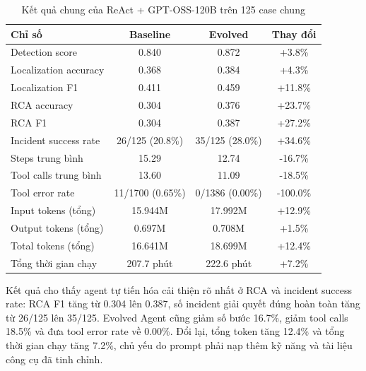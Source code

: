 \begin{table}[t]
\centering
\small
\caption{Kết quả chung của ReAct + GPT-OSS-120B trên 125 case chung}
\begin{tabularx}{\textwidth}{@{}Yccc@{}}
\toprule
\textbf{Chỉ số} & \textbf{Baseline} & \textbf{Evolved} & \textbf{Thay đổi} \\
\midrule
Detection score & 0.840 & 0.872 & +3.8\% \\
Localization accuracy & 0.368 & 0.384 & +4.3\% \\
Localization F1 & 0.411 & 0.459 & +11.8\% \\
RCA accuracy & 0.304 & 0.376 & +23.7\% \\
RCA F1 & 0.304 & 0.387 & +27.2\% \\
Incident success rate & 26/125 (20.8\%) & 35/125 (28.0\%) & +34.6\% \\
\midrule
Steps trung bình & 15.29 & 12.74 & -16.7\% \\
Tool calls trung bình & 13.60 & 11.09 & -18.5\% \\
Tool error rate & 11/1700 (0.65\%) & 0/1386 (0.00\%) & -100.0\% \\
Input tokens (tổng) & 15.944M & 17.992M & +12.9\% \\
Output tokens (tổng) & 0.697M & 0.708M & +1.5\% \\
Total tokens (tổng) & 16.641M & 18.699M & +12.4\% \\
Tổng thời gian chạy & 207.7 phút & 222.6 phút & +7.2\% \\
\bottomrule
\end{tabularx}
\end{table}

Kết quả cho thấy agent tự tiến hóa cải thiện rõ nhất ở RCA và incident success rate: RCA F1 tăng từ 0.304 lên 0.387, số incident giải quyết đúng hoàn toàn tăng từ 26/125 lên 35/125. Evolved Agent cũng giảm số bước 16.7\%, giảm tool calls 18.5\% và đưa tool error rate về 0.00\%. Đổi lại, tổng token tăng 12.4\% và tổng thời gian chạy tăng 7.2\%, chủ yếu do prompt phải nạp thêm kỹ năng và tài liệu công cụ đã tinh chỉnh.

